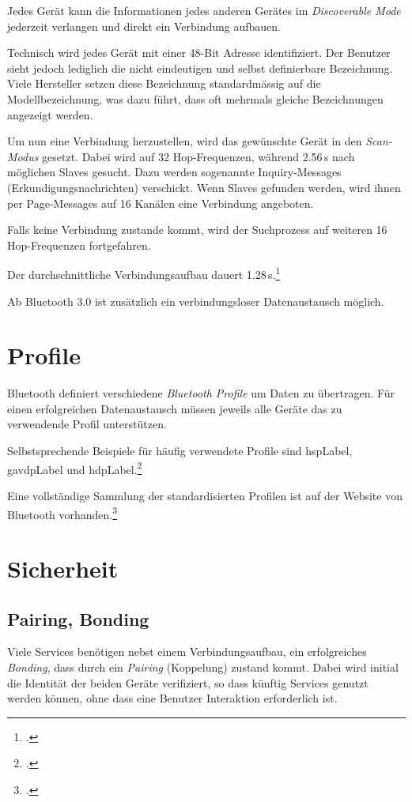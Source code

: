 Jedes Gerät kann die Informationen jedes anderen Gerätes im \textit{Discoverable Mode} jederzeit verlangen und direkt ein Verbindung aufbauen.

Technisch wird jedes Gerät mit einer 48-Bit Adresse identifiziert. Der Benutzer sieht jedoch lediglich die nicht eindeutigen und selbst definierbare Bezeichnung. Viele Hersteller setzen diese Bezeichnung standardmässig auf die Modellbezeichnung, was dazu führt, dass oft mehrmals gleiche Bezeichnungen angezeigt werden.

Um nun eine Verbindung herzustellen, wird das gewünschte Gerät in den \textit{Scan-Modus} gesetzt.
Dabei wird auf 32 Hop-Frequenzen, während 2.56\,s nach möglichen Slaves gesucht. Dazu werden sogenannte Inquiry-Messages (Erkundigungsnachrichten) verschickt.
Wenn Slaves gefunden werden, wird ihnen per Page-Messages auf 16 Kanälen eine Verbindung angeboten.

Falls keine Verbindung zustande kommt, wird der Suchprozess auf weiteren 16 Hop-Frequenzen fortgefahren.

Der durchschnittliche Verbindungsaufbau dauert 1.28\,s.\footcite{Bluetooth_de_Wikipedia_2015-04-18}

Ab Bluetooth 3.0 ist zusätzlich ein verbindungsloser Datenaustausch möglich.

\section{Profile}
Bluetooth definiert verschiedene \textit{Bluetooth Profile} um Daten zu übertragen.
Für einen erfolgreichen Datenaustausch müssen jeweils alle Geräte das zu verwendende Profil unterstützen.

Selbstsprechende Beispiele für häufig verwendete Profile sind \gls{hspLabel}, \gls{gavdpLabel} und  \gls{hdpLabel}.\footcite{List_of_Bluetooth_profiles_Wikipedia_2015-04-27}

Eine vollständige Sammlung der standardisierten Profilen ist auf der Website von Bluetooth vorhanden.\footcite{Profiles_Overview_Bluetooth_Development_Portal_2015-04-27}


\section{Sicherheit}

\subsection{Pairing, Bonding}
Viele Services benötigen nebst einem Verbindungsaufbau, ein erfolgreiches \textit{Bonding}, dass durch ein \textit{Pairing} (Koppelung) zustand kommt.
Dabei wird initial die Identität der beiden Geräte verifiziert, so dass künftig Services genutzt werden können, ohne dass eine Benutzer Interaktion erforderlich ist.

